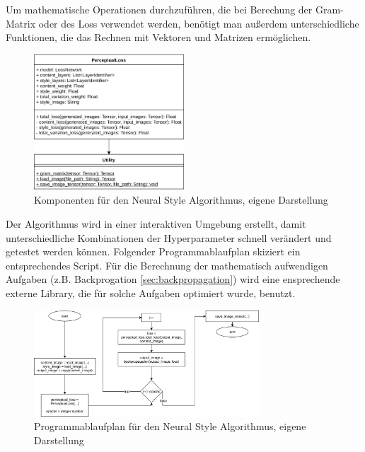 Um mathematische Operationen durchzuführen, die bei Berechung der Gram-Matrix oder des Loss verwendet werden, benötigt man außerdem unterschiedliche Funktionen, die das Rechnen mit Vektoren und Matrizen ermöglichen.


\begin{figure}[H]
	\centering
	\includegraphics[width=0.50\textwidth]{resources/content/neural_style_class_diagram.png}
	\caption{Komponenten für den Neural Style Algorithmus, eigene Darstellung}
	\label{img:neural_style_class_diagram_img}
\end{figure}

Der Algorithmus wird in einer interaktiven Umgebung erstellt, damit unterschiedliche Kombinationen der Hyperparameter schnell verändert und getestet werden können. Folgender Programmablaufplan skiziert ein entsprechendes Script. Für die Berechnung der mathematisch aufwendigen Aufgaben (z.B. Backprogation \ref{sec:backpropagation}) wird eine ensprechende externe Library, die für solche Aufgaben optimiert wurde, benutzt.

\begin{figure}[H]
	\centering
	\includegraphics[width=0.75\textwidth]{resources/content/neural_style_pap.png}
	\caption{Programmablaufplan für den Neural Style Algorithmus, eigene Darstellung}
	\label{img:neural_style_pap_img}
\end{figure}

